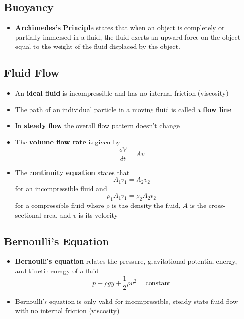 \documentclass{article}
\begin{document}
\subsection{Buoyancy}

\begin{itemize}
    \item \textbf{Archimedes's Principle} states that when an object is completely or partially immersed in a fluid, the fluid exerts an upward force on the object equal to the weight of the fluid displaced by the object.
\end{itemize}

\subsection{Fluid Flow}

\begin{itemize}
    \item An \textbf{ideal fluid} is incompressible and has no internal friction (viscosity)

    \item The path of an individual particle in a moving fluid is called a \textbf{flow line}

    \item In \textbf{steady flow} the overall flow pattern doesn't change

    \item The \textbf{volume flow rate} is given by \[\frac{dV}{dt}=Av\]

    \item The \textbf{continuity equation} states that \[A_1v_1=A_2v_2\] for an incompressible fluid and \[\rho_1A_1v_1=\rho_2A_2v_2\] for a compressible fluid where $\rho$ is the density the fluid, $A$ is the cross-sectional area, and $v$ is its velocity
\end{itemize}

\subsection{Bernoulli's Equation}

\begin{itemize}
    \item \textbf{Bernoulli's equation} relates the pressure, gravitational potential energy, and kinetic energy of a fluid \[p + \rho gy + \frac{1}{2}\rho v^2 = \textrm{constant}\]

    \item Bernoulli's equation is only valid for incompressible, steady state fluid flow with no internal friction (viscosity)
\end{itemize}
\end{document}
